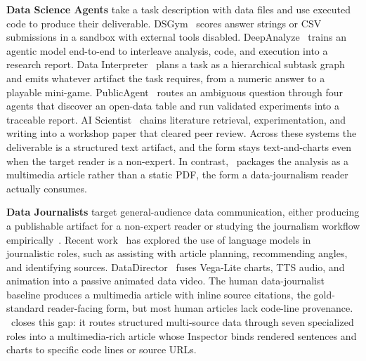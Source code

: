 \textbf{Data Science Agents}
\label{sec:related:dsagent}
take a task description with data files and use executed code to produce their deliverable. DSGym~\citep{dsgym} scores answer strings or CSV submissions in a sandbox with external tools disabled. DeepAnalyze~\citep{deepanalyze} trains an agentic model end-to-end to interleave analysis, code, and execution into a research report. Data Interpreter~\citep{datainterpreter} plans a task as a hierarchical subtask graph and emits whatever artifact the task requires, from a numeric answer to a playable mini-game. PublicAgent~\citep{publicagent} routes an ambiguous question through four agents that discover an open-data table and run validated experiments into a traceable report. AI Scientist~\citep{aiscientist,aiscientistv2} chains literature retrieval, experimentation, and writing into a workshop paper that cleared peer review. Across these systems the deliverable is a structured text artifact, and the form stays text-and-charts even when the target reader is a non-expert. In contrast, \methodshort\ packages the analysis as a multimedia article rather than a static PDF, the form a data-journalism reader actually consumes.

\textbf{Data Journalists}
\label{sec:related:journalist}
target general-audience data communication, either producing a publishable artifact for a non-expert reader or studying the journalism workflow empirically~\cite{handbook}. 
Recent work~\cite{brigham2024developing,journalistplan,cheng2025journalism,spangher2025novel,alshomary2026llms} has explored the use of language models in journalistic roles, such as assisting with article planning, recommending angles, and identifying sources.
DataDirector~\citep{datadirector} fuses Vega-Lite charts, TTS audio, and animation into a passive animated data video. 
The human data-journalist baseline produces a multimedia article with inline source citations, the gold-standard reader-facing form, but most human articles lack code-line provenance. 
\methodshort\ closes this gap: it routes structured multi-source data through seven specialized roles into a multimedia-rich article whose Inspector binds rendered sentences and charts to specific code lines or source URLs.
